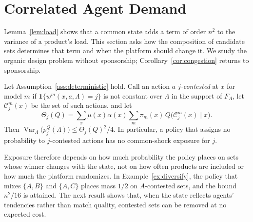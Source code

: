 \documentclass[opre,dblanonrev]{informs4}
\providecommand{\1}{\mathbf{1}}
\providecommand{\Var}{\operatorname{Var}}
\begin{document}
\section{Correlated Agent Demand}\label{sec:correlated}

Lemma~\ref{lem:load} shows that a common state adds a term of order $n^2$ to the variance of a product's load. This section asks how the composition of candidate sets determines that term and when the platform should change it. We study the organic design problem without sponsorship; Corollary~\ref{cor:congestion} returns to sponsorship.

\begin{lemma}\label{lem:contested}
Let Assumption~\ref{ass:deterministic} hold. Call an action $a$ \emph{$j$-contested} at $x$ for model $m$ if $\1\{w^m(x,a,\Lambda)=j\}$ is not constant over $\Lambda$ in the support of $F_\Lambda$, let $\mathcal C_j^m(x)$ be the set of such actions, and let
\[
\Theta_j(Q)=\sum_x\mu(x)\alpha(x)\sum_m\pi_m(x)\,Q\bigl(\mathcal C_j^m(x)\mid x\bigr).
\]
Then $\Var_\Lambda\bigl(p_j^Q(\Lambda)\bigr)\le\Theta_j(Q)^2/4$. In particular, a policy that assigns no probability to $j$-contested actions has no common-shock exposure for $j$.
\end{lemma}

Exposure therefore depends on how much probability the policy places on sets whose winner changes with the state, not on how often products are included or how much the platform randomizes. In Example~\ref{ex:diversify}, the policy that mixes $\{A,B\}$ and $\{A,C\}$ places mass $1/2$ on $A$-contested sets, and the bound $n^2/16$ is attained. The next result shows that, when the state reflects agents' tendencies rather than match quality, contested sets can be removed at no expected cost.
\end{document}
